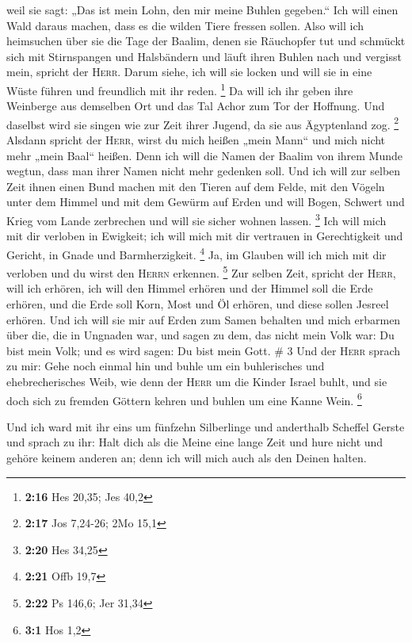 weil sie sagt: „Das ist mein Lohn, den mir meine Buhlen gegeben.`` Ich
will einen Wald daraus machen, dass es die wilden Tiere fressen sollen.
 Also will ich heimsuchen über sie die Tage der Baalim,
denen sie Räuchopfer tut und schmückt sich mit Stirnspangen und
Halsbändern und läuft ihren Buhlen nach und vergisst mein, spricht der
\textsc{Herr}.  Darum siehe, ich will sie locken und will
sie in eine Wüste führen und freundlich mit ihr reden. \footnote{\textbf{2:16}
  Hes 20,35; Jes 40,2}  Da will ich ihr geben ihre
Weinberge aus demselben Ort und das Tal Achor zum Tor der Hoffnung. Und
daselbst wird sie singen wie zur Zeit ihrer Jugend, da sie aus
Ägyptenland zog. \footnote{\textbf{2:17} Jos 7,24-26; 2Mo 15,1}
 Alsdann spricht der \textsc{Herr}, wirst du mich heißen
„mein Mann`` und mich nicht mehr „mein Baal`` heißen. 
Denn ich will die Namen der Baalim von ihrem Munde wegtun, dass man
ihrer Namen nicht mehr gedenken soll.  Und ich will zur
selben Zeit ihnen einen Bund machen mit den Tieren auf dem Felde, mit
den Vögeln unter dem Himmel und mit dem Gewürm auf Erden und will Bogen,
Schwert und Krieg vom Lande zerbrechen und will sie sicher wohnen
lassen. \footnote{\textbf{2:20} Hes 34,25}  Ich will mich
mit dir verloben in Ewigkeit; ich will mich mit dir vertrauen in
Gerechtigkeit und Gericht, in Gnade und Barmherzigkeit. \footnote{\textbf{2:21}
  Offb 19,7}  Ja, im Glauben will ich mich mit dir
verloben und du wirst den \textsc{Herrn} erkennen. \footnote{\textbf{2:22}
  Ps 146,6; Jer 31,34}  Zur selben Zeit, spricht der
\textsc{Herr}, will ich erhören, ich will den Himmel erhören und der
Himmel soll die Erde erhören,  und die Erde soll Korn,
Most und Öl erhören, und diese sollen Jesreel erhören. 
Und ich will sie mir auf Erden zum Samen behalten und mich erbarmen über
die, die in Ungnaden war, und sagen zu dem, das nicht mein Volk war: Du
bist mein Volk; und es wird sagen: Du bist mein Gott. \# 3
 Und der \textsc{Herr} sprach zu mir: Gehe noch einmal hin
und buhle um ein buhlerisches und ehebrecherisches Weib, wie denn der
\textsc{Herr} um die Kinder Israel buhlt, und sie doch sich zu fremden
Göttern kehren und buhlen um eine Kanne Wein. \footnote{\textbf{3:1} Hos
  1,2}

 Und ich ward mit ihr eins um fünfzehn Silberlinge und
anderthalb Scheffel Gerste  und sprach zu ihr: Halt dich
als die Meine eine lange Zeit und hure nicht und gehöre keinem anderen
an; denn ich will mich auch als den Deinen halten.

